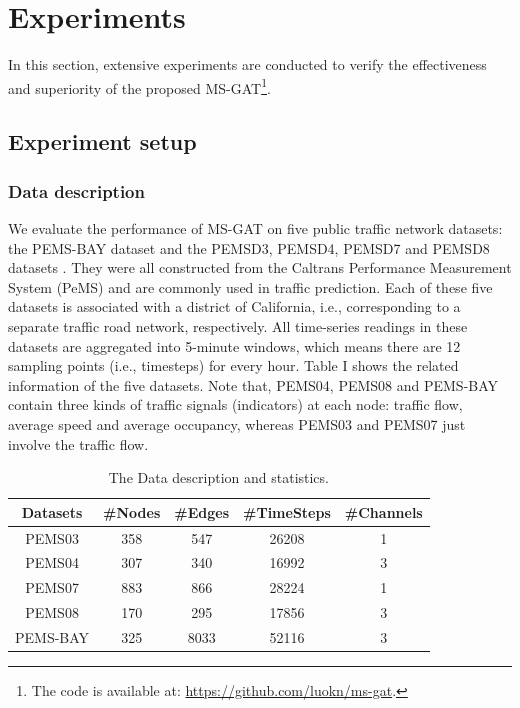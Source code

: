 \section{Experiments}
\label{sec:experiments}
In this section, extensive experiments are conducted to verify the effectiveness and superiority of the proposed MS-GAT\footnote{The code is available at: \url{https://github.com/luokn/ms-gat}.}.

\subsection{Experiment setup}
\subsubsection{Data description}
We evaluate the performance of MS-GAT on five public traffic network datasets: the PEMS-BAY dataset  \cite{li2017diffusion} and the PEMSD3, PEMSD4, PEMSD7 and PEMSD8 datasets  \cite{song2020spatial}. They were all constructed from the Caltrans Performance Measurement System (PeMS) \cite{chen2001freeway} and are commonly used in traffic prediction. Each of these five datasets is associated with a district of California, i.e., corresponding to a separate traffic road network, respectively. All time-series readings in these datasets are aggregated into 5-minute windows, which means there are 12 sampling points (i.e., timesteps) for every hour. Table I shows the related information of the five datasets. Note that, PEMS04, PEMS08 and PEMS-BAY contain three kinds of traffic signals (indicators) at each node: traffic flow, average speed and average occupancy, whereas PEMS03 and PEMS07 just involve the traffic flow.

\begin{table}[!htb]
    \caption{The Data description and statistics.}
    \label{tab:datasets}
    \centering
    \begin{tabular}{ccccc}
        \toprule[2pt]
        Datasets & \#Nodes & \#Edges & \#TimeSteps & \#Channels \\
        \hline
        PEMS03   & 358     & 547     & 26208       & 1          \\
        PEMS04   & 307     & 340     & 16992       & 3          \\
        PEMS07   & 883     & 866     & 28224       & 1          \\
        PEMS08   & 170     & 295     & 17856       & 3          \\
        PEMS-BAY & 325     & 8033    & 52116       & 3          \\
        \bottomrule[2pt]
    \end{tabular}
\end{table}

